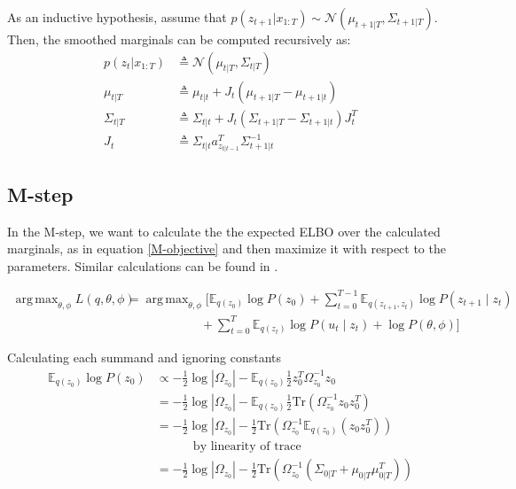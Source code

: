 \documentclass[11pt, reqno]{article}
\DeclareMathOperator*{\argmax}{arg\,max}
\numberwithin{equation}{section}
\begin{document}
As an inductive hypothesis, assume that $p(z_{t+1} | x_{1:T}) \sim \mathcal{N}(\mu_{t+1|T}, \Sigma_{t+1|T})$. Then, the smoothed marginals can be computed recursively as:
\begin{align*}
p(z_t | x_{1:T}) &\triangleq \mathcal{N}(\mu_{t|T}, \Sigma_{t|T}) \\
\mu_{t|T} &\triangleq \mu_{t|t} + J_t \left(\mu_{t+1|T}  - \mu_{t+1|t} \right) \\
\Sigma_{t|T} &\triangleq \Sigma_{t|t} + J_t \left(\Sigma_{t+1|T} - \Sigma_{t+1|t} \right) J_t^T \\
J_t &\triangleq \Sigma_{t|t} a^T_{z_{t|t-1}}\Sigma^{-1}_{t+1|t} 
\end{align*}


\subsection{M-step}
In the M-step, we want to calculate the the expected ELBO over the calculated marginals, as in equation \ref{M-objective} and then maximize it with respect to the parameters. Similar calculations can be found in \cite{Shumway1982}.

\begin{align*}
\argmax_{\theta, \phi} L(q,\theta,\phi) &= \argmax_{\theta, \phi} \Bigg[\mathbb{E}_{q(z_0)} \log P(z_0) + \sum_{t=0}^{T-1} \mathbb{E}_{q(z_{t+1}, z_t)} \log P(z_{t+1} \mid z_t) \\
&\hspace{6em} + \sum_{t=0}^T \mathbb{E}_{q(z_t)} \log P(u_t \mid z_t)  + \log P(\theta, \phi) \Bigg]
\end{align*}

Calculating each summand and ignoring constants
\begin{align*}
\mathbb{E}_{q(z_0)} \log P(z_0) &\propto -\frac{1}{2} \log |\Omega_{z_0}|  - \mathbb{E}_{q(z_0)}\frac{1}{2} z_0^T\Omega_{z_0}^{-1}z_0 \\
&=  -\frac{1}{2} \log |\Omega_{z_0}| - \mathbb{E}_{q(z_0)}\frac{1}{2} \mathrm{Tr}(\Omega_{z_0}^{-1}z_0z_0^T) \\
&=  -\frac{1}{2} \log |\Omega_{z_0}| - \frac{1}{2} \mathrm{Tr}(\Omega_{z_0}^{-1}\mathbb{E}_{q(z_0)} (z_0z_0^T)) \\
& \hspace{3em} \text{by linearity of trace} \\
&=  -\frac{1}{2} \log |\Omega_{z_0}| - \frac{1}{2} \mathrm{Tr}\left(\Omega_{z_0}^{-1}\left( \Sigma_{0|T} + \mu_{0|T}\mu_{0|T}^T \right)\right)
\end{align*}
\end{document}
